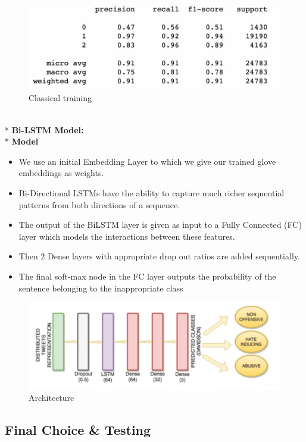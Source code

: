 \documentclass{article}[A4]
\begin{document}
\begin{figure}[!htb]
    \centering
    \includegraphics[scale=0.50]{classical.png}
    \caption{Classical training}
    \label{fig:model_res}
\end{figure}
\\*
\textbf{Bi-LSTM Model:}\\*
\textbf{Model} 
\begin{itemize}
\item{We use an initial Embedding Layer to which we give our trained glove embeddings as weights. }
\item{Bi-Directional LSTMs have the ability to capture much richer sequential patterns from both directions of a sequence.}
\item{The output of the BiLSTM layer is given as input to a Fully Connected (FC) layer which models the interactions between these features.}
\item{Then 2 Dense layers with appropriate drop out ratios are added sequentially.}
\item{The final soft-max node in the FC layer outputs the probability of the sentence belonging to the inappropriate class}
\end{itemize}
\begin{figure}[!htb]
    \centering
    \includegraphics[scale=0.50]{model.png}
    \caption{Architecture}
    \label{fig:model_res}
\end{figure}

\subsection{Final Choice \& Testing}
\end{document}
